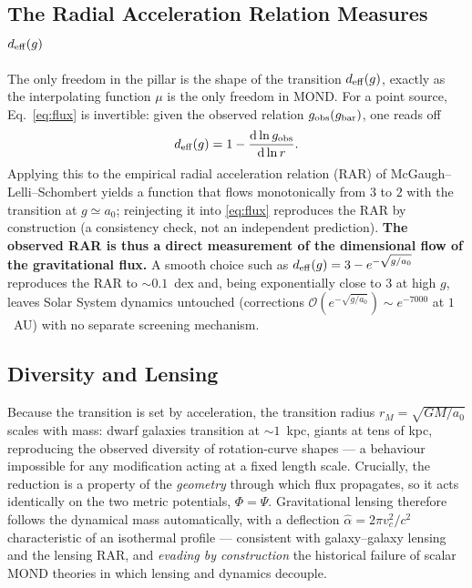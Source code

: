 \documentclass[11pt,a4paper]{article}
\begin{document}
\begin{onehalfspacing}
\subsection{The Radial Acceleration Relation Measures $d_{\rm eff}(g)$}
The only freedom in the pillar is the shape of the transition $d_{\rm eff}(g)$, exactly as the interpolating function $\mu$ is the only freedom in MOND. For a point source, Eq.~\eqref{eq:flux} is invertible: given the observed relation $g_{\rm obs}(g_{\rm bar})$, one reads off
\begin{equation}
d_{\rm eff}(g) = 1 - \frac{\mathrm{d}\ln g_{\rm obs}}{\mathrm{d}\ln r}.
\end{equation}
Applying this to the empirical radial acceleration relation (RAR) of McGaugh--Lelli--Schombert yields a function that flows monotonically from $3$ to $2$ with the transition at $g\simeq a_0$; reinjecting it into \eqref{eq:flux} reproduces the RAR by construction (a consistency check, not an independent prediction). \textbf{The observed RAR is thus a direct measurement of the dimensional flow of the gravitational flux.} A smooth choice such as $d_{\rm eff}(g)=3-e^{-\sqrt{g/a_0}}$ reproduces the RAR to $\sim0.1$~dex and, being exponentially close to $3$ at high $g$, leaves Solar System dynamics untouched (corrections $\mathcal{O}(e^{-\sqrt{g/a_0}})\sim e^{-7000}$ at $1$~AU) with no separate screening mechanism.
\subsection{Diversity and Lensing}
Because the transition is set by acceleration, the transition radius $r_M=\sqrt{GM/a_0}$ scales with mass: dwarf galaxies transition at $\sim 1$~kpc, giants at tens of kpc, reproducing the observed diversity of rotation-curve shapes --- a behaviour impossible for any modification acting at a fixed length scale. Crucially, the reduction is a property of the \emph{geometry} through which flux propagates, so it acts identically on the two metric potentials, $\Phi=\Psi$. Gravitational lensing therefore follows the dynamical mass automatically, with a deflection $\hat\alpha = 2\pi v_c^2/c^2$ characteristic of an isothermal profile --- consistent with galaxy--galaxy lensing and the lensing RAR, and \emph{evading by construction} the historical failure of scalar MOND theories in which lensing and dynamics decouple.

\end{onehalfspacing}
\end{document}
